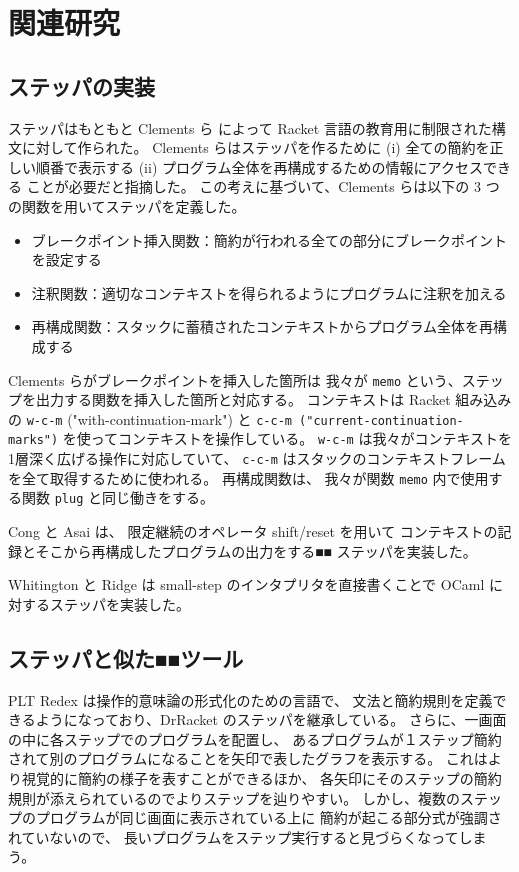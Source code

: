 \chapter{関連研究}
\label{chapter:related}

\section{ステッパの実装}
\label{section:stepper__related}

ステッパはもともと Clements ら \cite{clements01} によって
Racket 言語の教育用に制限された構文に対して作られた。
Clements らはステッパを作るために
(i) 全ての簡約を正しい順番で表示する
(ii) プログラム全体を再構成するための情報にアクセスできる
ことが必要だと指摘した。
この考えに基づいて、Clements らは以下の 3 つの関数を用いてステッパを定義した。
\begin{itemize}
\item ブレークポイント挿入関数：簡約が行われる全ての部分にブレークポイントを設定する
\item 注釈関数：適切なコンテキストを得られるようにプログラムに注釈を加える
\item 再構成関数：スタックに蓄積されたコンテキストからプログラム全体を再構成する
\end{itemize}
Clements らがブレークポイントを挿入した箇所は
我々が \texttt{memo} という、ステップを出力する関数を挿入した箇所と対応する。
コンテキストは Racket 組み込みの
\texttt{w-c-m} ("with-continuation-mark") と
\texttt{c-c-m ("current-continuation-marks")}
を使ってコンテキストを操作している。
\texttt{w-c-m} は我々がコンテキストを1層深く広げる操作に対応していて、
\texttt{c-c-m} はスタックのコンテキストフレームを全て取得するために使われる。
再構成関数は、
我々が関数 \texttt{memo} 内で使用する関数 \texttt{plug} と同じ働きをする。

Cong と Asai \cite{Cong16} は、
限定継続のオペレータ shift/reset を用いて
コンテキストの記録とそこから再構成したプログラムの出力をする■■
ステッパを実装した。

Whitington と Ridge \cite{EPTCS294.3} は
small-step のインタプリタを直接書くことで
OCaml に対するステッパを実装した。

\section{ステッパと似た■■ツール}

PLT Redex \cite{felleisen09}は操作的意味論の形式化のための言語で、
文法と簡約規則を定義できるようになっており、DrRacket のステッパを継承している。
さらに、一画面の中に各ステップでのプログラムを配置し、
あるプログラムが１ステップ簡約されて別のプログラムになることを矢印で表したグラフを表示する。
これはより視覚的に簡約の様子を表すことができるほか、
各矢印にそのステップの簡約規則が添えられているのでよりステップを辿りやすい。
しかし、複数のステップのプログラムが同じ画面に表示されている上に
簡約が起こる部分式が強調されていないので、
長いプログラムをステップ実行すると見づらくなってしまう。

